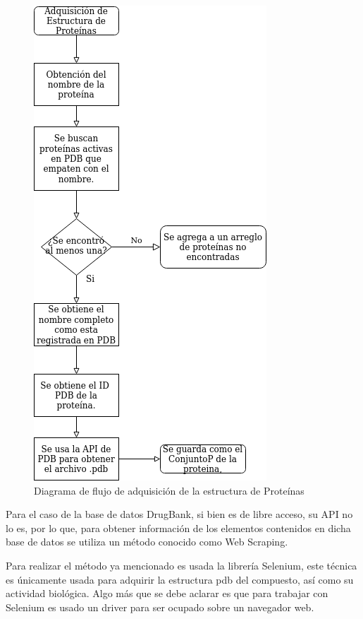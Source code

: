 \begin{figure}[H]
    \centering
    \includegraphics[scale=0.75]{Capitulo4/Documentos/imagenes_generacion/EstructuraPro.png}
    \caption{Diagrama de flujo de adquisición de la estructura de  Proteínas}
    \label{Adquisicion_estructura}
\end{figure}

\noindent Para el caso de la base de datos DrugBank, si bien es de libre acceso, su API no lo es, por lo que, para obtener información de los elementos contenidos en dicha base de datos se utiliza un método conocido como Web Scraping. 

\noindent Para realizar el método ya mencionado es usada la librería Selenium, este técnica es únicamente usada para adquirir la estructura pdb del compuesto, así como su actividad biológica.  Algo más que se debe aclarar es que para trabajar con Selenium es usado un driver para ser ocupado sobre un navegador web.\\

